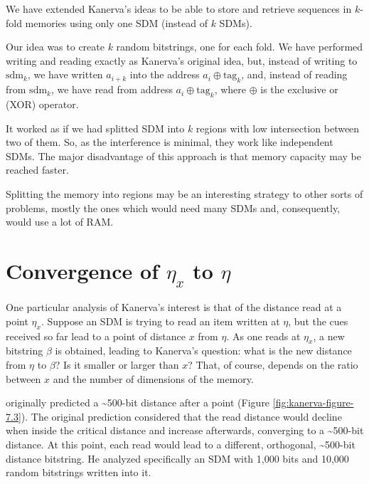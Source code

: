 We have extended Kanerva's ideas to be able to store and retrieve sequences in $k$-fold memories using only one SDM (instead of $k$ SDMs).

Our idea was to create $k$ random bitstrings, one for each fold. We have performed writing and reading exactly as Kanerva's original idea, but, instead of writing to $\text{sdm}_k$, we have written $a_{i+k}$ into the address $a_i \oplus \text{tag}_k$, and, instead of reading from $\text{sdm}_k$, we have read from address $a_i \oplus \text{tag}_k$, where $\oplus$ is the exclusive or (XOR) operator.

It worked as if we had splitted SDM into $k$ regions with low intersection between two of them. So, as the interference is minimal, they work like independent SDMs. The major disadvantage of this approach is that memory capacity may be reached faster.

Splitting the memory into regions may be an interesting strategy to other sorts of problems, mostly the ones which would need many SDMs and, consequently, would use a lot of RAM.


\section{Convergence of $\eta_x$ to $\eta$}

One particular analysis of Kanerva's interest is that of the distance read at a point $\eta_x$. Suppose an SDM is trying to read an item written at $\eta$, but the cues received so far lead to a point of distance $x$ from $\eta$.  As one reads at $\eta_x$, a new bitstring $\beta$ is obtained, leading to Kanerva's question: what is the new distance from $\eta$ to $\beta$? Is it smaller or larger than $x$? That, of course, depends on the ratio between $x$ and the number of dimensions of the memory.

\citet[p.70]{Kanerva1988} originally predicted a \textasciitilde 500-bit distance after a point (Figure \ref{fig:kanerva-figure-7.3}). The original prediction considered that the read distance would decline when inside the critical distance and increase afterwards, converging to a \textasciitilde 500-bit distance.  At this point, each read would lead to a different, orthogonal, \textasciitilde 500-bit distance bitstring. He analyzed specifically an SDM with 1,000 bits and 10,000 random bitstrings written into it.

